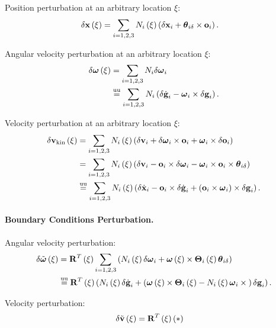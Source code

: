 Position perturbation at an arbitrary location $\xi$:
\begin{align}
	\delta\bm{\mathbf{x}}\left( \xi \right)
	&=
	\sum_{i=1,2,3} N_i\left( \xi \right) \left( 
		\delta\bm{\mathbf{x}}_i + \bm{\mathbf{\theta}}_{i\delta}\times\bm{\mathbf{o}}_i
	 \right)
	.
\end{align}

Angular velocity perturbation at an arbitrary location $\xi$:
\begin{align}
	\delta\bm{\mathbf{\omega}}\left( \xi \right)
	&=
	\sum_{i=1,2,3} N_i \delta\bm{\mathbf{\omega}}_i
	\nonumber \\
	&\overset{\text{uu}}{=}
	\sum_{i=1,2,3} N_i \left( 
		\delta\dot{\bm{\mathbf{g}}}_i
		- \bm{\mathbf{\omega}}_i \times \delta\bm{\mathbf{g}}_i
	 \right)
	.
\end{align}

Velocity perturbation at an arbitrary location $\xi$:
\begin{align}
	\delta\bm{\mathbf{v}}_{\text{kin}}\left( \xi \right)
	&=
	\sum_{i=1,2,3} N_i\left( \xi \right) \left( 
		\delta\bm{\mathbf{v}}_i
		+ \delta\bm{\mathbf{\omega}}_i \times \bm{\mathbf{o}}_i
		+ \bm{\mathbf{\omega}}_i \times \delta\bm{\mathbf{o}}_i
	 \right)
	\nonumber \\
	&= 
	\sum_{i=1,2,3} N_i\left( \xi \right) \left( 
		\delta\bm{\mathbf{v}}_i
		- \bm{\mathbf{o}}_i \times \delta\bm{\mathbf{\omega}}_i
		- \bm{\mathbf{\omega}}_i \times \bm{\mathbf{o}}_i \times \bm{\mathbf{\theta}}_{i\delta}
	 \right)
	\nonumber \\
	&\overset{\text{uu}}{=}
	\sum_{i=1,2,3} N_i\left( \xi \right) \left( 
		\delta\dot{\bm{\mathbf{x}}}_i
		- \bm{\mathbf{o}}_i \times \delta\dot{\bm{\mathbf{g}}}_i
		+ \left( \bm{\mathbf{o}}_i \times \bm{\mathbf{\omega}}_i \right) \times \delta\bm{\mathbf{g}}_i
	 \right)
	.
\end{align}


\paragraph{Boundary Conditions Perturbation.}
Angular velocity perturbation:
\begin{align}
	\delta\tilde{\bm{\mathbf{\omega}}}\left( \xi \right)
	&= \bm{\mathbf{R}}^T\left( \xi \right) \sum_{i=1,2,3}\left( 
		N_i\left( \xi \right) \delta\bm{\mathbf{\omega}}_i
		+ \bm{\mathbf{\omega}}\left( \xi \right) \times \bm{\mathbf{\Theta}}_i\left( \xi \right) \bm{\mathbf{\theta}}_{i\delta}
	 \right)
	\nonumber \\
	&\overset{\text{uu}}{=}
	\bm{\mathbf{R}}^T\left( \xi \right) \left( 
		N_i\left( \xi \right) \delta\dot{\bm{\mathbf{g}}}_i
		+ \left( 
			\bm{\mathbf{\omega}}\left( \xi \right) \times \bm{\mathbf{\Theta}}_i\left( \xi \right)
			- N_i\left( \xi \right) \bm{\mathbf{\omega}}_i \times{}
		 \right) \delta\bm{\mathbf{g}}_i
	 \right)
	.
\end{align}

Velocity perturbation:
\begin{align}
	\delta\tilde{\bm{\mathbf{v}}}\left( \xi \right)
	&=
	\bm{\mathbf{R}}^T\left( \xi \right) \left( 
		*
	 \right)
\end{align}




